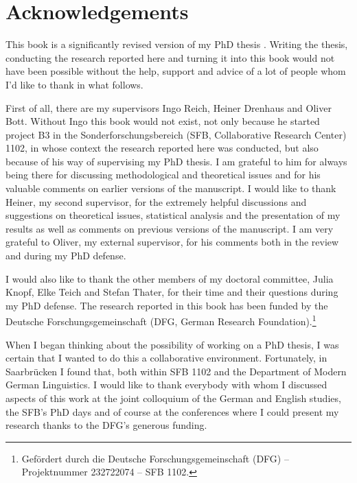 \chapter{Acknowledgements}
This book is a significantly revised version of my PhD thesis \citep{lemke2020}. Writing the thesis, conducting the research reported here and turning it into this book would not have been possible without the help, support and advice of a lot of people whom I'd like to thank in what follows. 

First of all, there are my supervisors Ingo Reich, Heiner Drenhaus and Oliver Bott. Without Ingo this book would not exist, not only because he started project B3 in the Sonderforschungsbereich (SFB, Collaborative Research Center) 1102, in whose context the research reported here was conducted, but also because of his way of supervising my PhD thesis. I am grateful to him for always being there for discussing methodological and theoretical issues and for his valuable comments on earlier versions of the manuscript. I would like to thank Heiner, my second supervisor, for the extremely helpful discussions and suggestions on theoretical issues, statistical analysis and the presentation of my results as well as comments on previous versions of the manuscript. I am very grateful to Oliver, my external supervisor, for his comments both in the review and during my PhD defense. 

I would also like to thank the other members of my doctoral committee, Julia Knopf, Elke Teich and Stefan Thater, for their time and their questions during my PhD defense. The research reported in this book has been funded by the Deutsche Forschungsgemeinschaft (DFG, German Research Foundation).\footnote{Gefördert durch die Deutsche Forschungsgemeinschaft (DFG) – Projektnummer 232722074 – SFB 1102.}

When I began thinking about the possibility of working on a PhD thesis, I was certain that I wanted to do this a collaborative environment. Fortunately, in Saarbrücken I found that, both within SFB 1102 and the Department of Modern German Linguistics. I would like to thank everybody with whom I discussed aspects of this work at the joint colloquium of the German and English studies, the SFB's PhD days and of course at the conferences where I could present my research thanks to the DFG's generous funding. 

